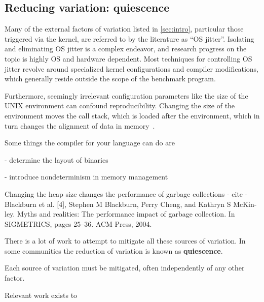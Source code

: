 \documentclass[conference]{IEEEtran}
\begin{document}
\subsection{Reducing variation: quiescence}

Many of the external factors of variation listed in \ref{sec:intro}, particular those
triggered via the kernel, are referred to by the literature as ``OS jitter''. Isolating
and eliminating OS jitter is a complex endeavor, and research progress on the topic is
highly OS and hardware dependent. Most techniques for controlling OS jitter revolve around
specialized kernel configurations and compiler modifications, which generally reside outside
the scope of the benchmark program. %

Furthermore, seemingly irrelevant configuration parameters like the size of the UNIX
environment can confound reproducibility. Changing the size of the environment moves the
call stack, which is loaded after the environment, which in turn changes the alignment of
data in memory~\cite{Mytkowicz2009}.


Some things the compiler for your language can do are

- determine the layout of binaries

- introduce nondeterminism in memory management

Changing the heap size changes the performance of garbage collections -
cite - Blackburn et al. [4], Stephen M Blackburn, Perry Cheng, and Kathryn S McKin- ley. Myths and realities: The performance impact of garbage collection. In SIGMETRICS, pages 25–36. ACM Press, 2004.


There is a lot of work to attempt to mitigate all these sources of variation.
In some communities the reduction of variation is known as \textbf{quiescence}.

Each source of variation must be mitigated, often independently of any other
factor.

Relevant work exists to

\end{document}
